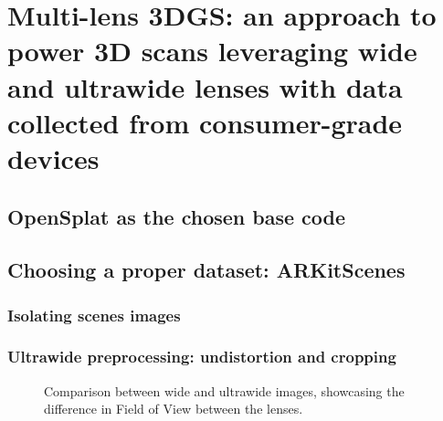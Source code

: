 \section{Multi-lens 3DGS: an approach to power 3D scans leveraging wide and ultrawide lenses with data collected from consumer-grade devices}

\towrite

\subsection{OpenSplat as the chosen base code}

\towrite

\subsection{Choosing a proper dataset: ARKitScenes}

\towrite

\subsubsection{Isolating scenes images}

\towrite



\subsubsection{Ultrawide preprocessing: undistortion and cropping}

\towrite





\begin{figure}[!htbp]
  \centering
  \hfill
  \hfill
  \caption{Comparison between wide and ultrawide images, showcasing the difference in Field of View between the lenses.}\label{fig:wide-vs-ultrawide}
\end{figure}

